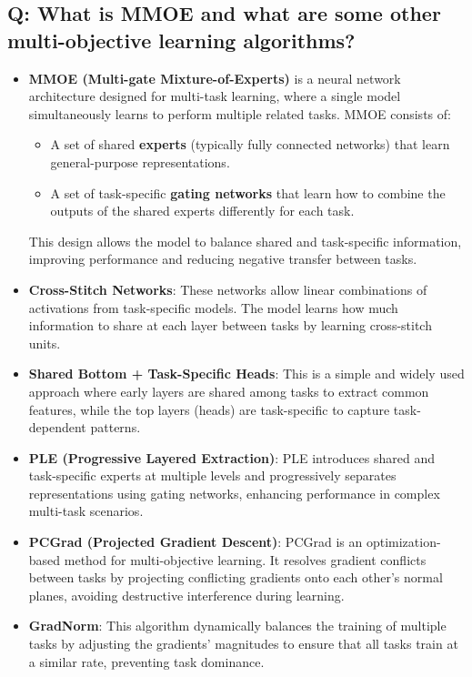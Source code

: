 \subsection*{Q: What is MMOE and what are some other multi-objective learning algorithms?}
\begin{itemize}
	\item \textbf{MMOE (Multi-gate Mixture-of-Experts)} is a neural network architecture designed for multi-task learning, where a single model simultaneously learns to perform multiple related tasks. MMOE consists of:
	      \begin{itemize}
		      \item A set of shared \textbf{experts} (typically fully connected networks) that learn general-purpose representations.
		      \item A set of task-specific \textbf{gating networks} that learn how to combine the outputs of the shared experts differently for each task.
	      \end{itemize}
	      This design allows the model to balance shared and task-specific information, improving performance and reducing negative transfer between tasks.

	\item \textbf{Cross-Stitch Networks}: These networks allow linear combinations of activations from task-specific models. The model learns how much information to share at each layer between tasks by learning cross-stitch units.

	\item \textbf{Shared Bottom + Task-Specific Heads}: This is a simple and widely used approach where early layers are shared among tasks to extract common features, while the top layers (heads) are task-specific to capture task-dependent patterns.

	\item \textbf{PLE (Progressive Layered Extraction)}: PLE introduces shared and task-specific experts at multiple levels and progressively separates representations using gating networks, enhancing performance in complex multi-task scenarios.

	\item \textbf{PCGrad (Projected Gradient Descent)}: PCGrad is an optimization-based method for multi-objective learning. It resolves gradient conflicts between tasks by projecting conflicting gradients onto each other's normal planes, avoiding destructive interference during learning.

	\item \textbf{GradNorm}: This algorithm dynamically balances the training of multiple tasks by adjusting the gradients' magnitudes to ensure that all tasks train at a similar rate, preventing task dominance.

\end{itemize}

